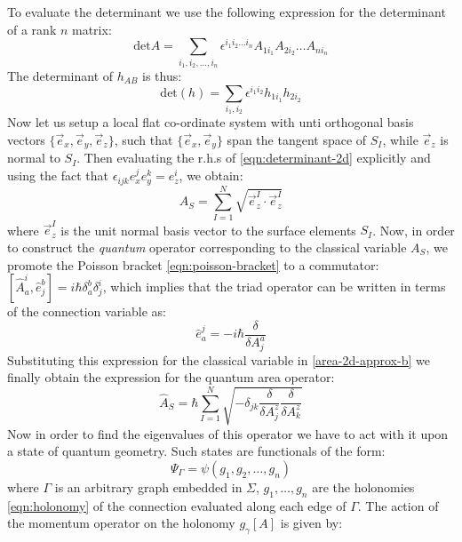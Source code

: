 \documentclass[a4paper]{article}
\begin{document}
To evaluate the determinant we use the following expression for the determinant of a rank $ n $ matrix:
\begin{equation}\label{eqn:determinant}
	\text{det} A = \sum_{i_1, i_2, \ldots,i_n} \epsilon^{i_1 i_2 \ldots i_n} A_{1 i_1} A_{2 i_2}\ldots A_{n i_n}
\end{equation}
The determinant of $ h_{AB} $ is thus:
\begin{equation}\label{eqn:determinant-2d}
	\text{det} (h) = \sum_{i_1,i_2} \epsilon^{i_1 i_2} h_{1 i_1} h_{2 i_2}
\end{equation}
Now let us setup a local flat co-ordinate system with unti orthogonal basis vectors $ \{\vec{e}_x, \vec{e}_y, \vec{e}_z\} $, such that $ \{ \vec{e}_x, \vec{e}_y \} $ span the tangent space of $ S_I $, while $ \vec{e}_z $ is normal to $ S_I $. Then evaluating the r.h.s of \eqref{eqn:determinant-2d} explicitly and using the fact that $ \epsilon_{ijk} e_x^j e_y^k = e_z^i $, we obtain:
\begin{equation}\label{area-2d-approx-b}
	A_S = \sum_{I=1}^N \sqrt{\vec{e}^I_z \cdot \vec{e}^I_z}
\end{equation}
where $ \vec{e}^I_z $ is the unit normal basis vector to the surface elements $ S_I $. Now, in order to construct the \emph{quantum} operator corresponding to the classical variable $ A_S $, we promote the Poisson bracket \eqref{eqn:poisson-bracket} to a commutator: $ [ \hat A_a^i, \hat e^b_j ] = i \hbar\delta^b_a \delta^i_j $, which implies that the triad operator can be written in terms of the connection variable as:
\begin{equation}\label{eqn:triad-operator}
	\hat e_a^j = -i\hbar \frac{\delta}{\delta A^a_j}
\end{equation}
Substituting this expression for the classical variable in \eqref{area-2d-approx-b} we finally obtain the expression for the quantum area operator:
\begin{equation}\label{eqn:area-quantum}
	\hat A_S = \hbar \sum_{I=1}^N \sqrt{ - \delta_{jk} \frac{\delta}{\delta A^z_j} \frac{\delta}{\delta A^z_k}} 
\end{equation}
Now in order to find the eigenvalues of this operator we have to act with it upon a state of quantum geometry. Such states are functionals of the form:
\begin{equation}\label{eqn:graph-state}
	\Psi_\Gamma = \psi(g_1,g_2,\ldots,g_n)
\end{equation}
where $ \Gamma $ is an arbitrary graph embedded in $ \Sigma $, $ g_1,\ldots,g_n $ are the holonomies \eqref{eqn:holonomy} of the connection evaluated along each edge of $ \Gamma $. The action of the momentum operator on the holonomy $ g_\gamma[A] $ is given by:
\end{document}
